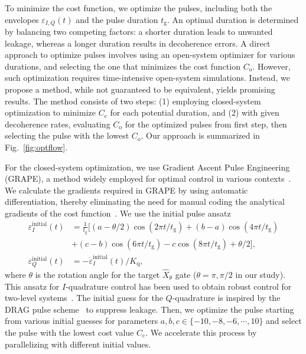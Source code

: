 \documentclass[12pt]{article}
\begin{document}
To minimize the cost function, we optimize the pulses, including both the envelopes $\varepsilon_{I,Q}(t)$ and the pulse duration $t_\text{g}$. 
An optimal duration is determined by balancing two competing factors: a shorter duration leads to unwanted leakage, whereas a longer duration results in decoherence errors. 
A direct approach to optimize pulses involves using an open-system optimizer for various durations, and selecting the one that minimizes the cost function $C_\text{o}$. 
However, such optimization requires time-intensive open-system simulations. 
Instead, we propose a method, while not guaranteed to be equivalent, yields promising results. 
The method consists of two steps: (1) employing closed-system optimization to minimize $C_\text{c}$ for each potential duration, and (2) with given decoherence rates, evaluating $C_\text{o}$ for the optimized pulses from first step, then selecting the pulse with the lowest $C_\text{o}$. 
Our approach is summarized in Fig.~\ref{fig:optflow}.

For the closed-system optimization, we use Gradient Ascent Pulse Engineering (GRAPE), a method widely employed for optimal control in various contexts~\cite{khaneja2005optimalrobustmetric,lu2023optimalgrape,koch2022quantumqocreview}. We calculate the gradients required in GRAPE by using automatic differentiation, thereby eliminating the need for manual coding the analytical gradients of the cost function~\cite{adscalingbaydin2014automatic,PhysRevA.95.042318ad,PhysRevA.99.052327ad}. We use the initial pulse ansatz
\begin{align*}
    \varepsilon^\text{initial}_I(t) &=\frac{1}{t_\text{g}}\big[ (a-\theta/2)\cos(2\pi t /t_\text{g}) + (b-a)\cos(4\pi t /t_\text{g})\\ 
     &+(c-b)\cos(6\pi t / t_\text{g}) - c\cos(8\pi t / t_\text{g}) + \theta/2\big],\\
    \varepsilon_Q^\text{initial}(t) & = -\dot{\varepsilon}_I^\text{initial}(t) / K_\text{q},
\end{align*}
where $\theta$ is the rotation angle for the target $\hat{X}_\theta$ gate ($\theta=\pi,\pi/2$ in our study). This ansatz for $I$-quadrature control has been used to obtain robust control for two-level systems~\cite{pasini2009optimizedinitialpulse}. The initial guess for the $Q$-quadrature is inspired by the DRAG pulse scheme~\cite{Motzoi2009} to suppress leakage. 
Then, we optimize the pulse starting from various initial guesses for parameters $a,b,c\in\{-10,-8,-6,\cdots,10\}$ and select the pulse with the lowest cost value $C_\text{c}$. We accelerate this process by parallelizing with different initial values.
\end{document}
